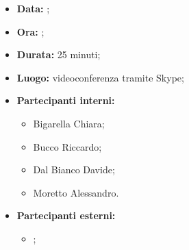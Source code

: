 
	\begin{itemize}
		\item \textbf{Data:} ;
		\item \textbf{Ora:} ;
		\item \textbf{Durata:} 25 minuti;
		\item \textbf{Luogo:} videoconferenza tramite Skype;
		\item \textbf{Partecipanti interni:}
			\begin{itemize}
				\item Bigarella Chiara;
				\item Bucco Riccardo;
				\item Dal Bianco Davide;
				\item Moretto Alessandro.
			\end{itemize}
		\item \textbf{Partecipanti esterni:}
		\begin{itemize}
			\item \proponente;
		\end{itemize}
	\end{itemize}
\newpage
